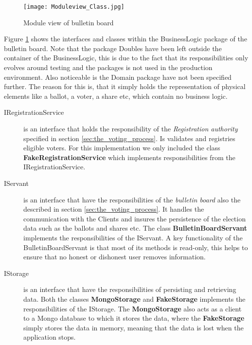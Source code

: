 \begin{figure}[H]
    \centering
    \texttt{[image: Moduleview\_Class.jpg]}
    \caption{Module view of bulletin board}
    \label{fig:module_over_of_bulletinboar}
\end{figure}

\noindent
Figure \ref{fig:module_over_of_bulletinboar} shows the interfaces and classes within the BusinessLogic package of the bulletin board. Note that the package Doubles have been left outside the container of the BusinessLogic, this is due to the fact that its responsibilities only evolves around testing and the packages is not used in the production environment. Also noticeable is the Domain package have not been specified further. The reason for this is, that it simply holds the representation of physical elements like a ballot, a voter, a share etc, which contain no business logic.

\begin{description}
    \item[IRegistrationService] is an interface that holds the responsibility of the \textit{Registration authority} specified in section \ref{sec:the_voting_process}. Is validates and registries eligible voters.  For this implementation we only included the class \textbf{FakeRegistrationService} which implements responsibilities from the IRegistrationService. 
    
    \item[IServant] is an interface that have the responsibilities of the \textit{bulletin board} also the described in section \ref{sec:the_voting_process}. It handles the communication with the Clients and insures the persistence of the election data such as the ballots and shares etc. The class \textbf{BulletinBoardServant} implements the responsibilities of the IServant. A key functionality of the BulletinBoardServant is that most of its methods is read-only, this helps to ensure that no honest or dishonest user removes information. 
    
    \item[IStorage] is an interface that have the responsibilities of persisting and retrieving data. Both the classes \textbf{MongoStorage} and \textbf{FakeStorage} implements the responsibilities of the IStorage. The \textbf{MongoStorage} also acts as a client to a Mongo database to which it stores the data, where the \textbf{FakeStorage} simply stores the data in memory, meaning that the data is lost when the application stops. 
    
\end{description}

